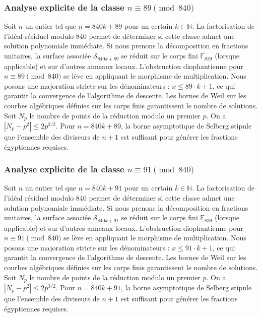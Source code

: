 \documentclass[11pt,a4paper]{article}
\begin{document}
\subsubsection{Analyse explicite de la classe $n \equiv 89 \pmod{840}$}
Soit $n$ un entier tel que $n = 840k + 89$ pour un certain $k \in \mathbb{N}$.
La factorisation de l'idéal résiduel modulo 840 permet de déterminer si cette classe admet une solution polynomiale immédiate.
Si nous prenons la décomposition en fractions unitaires, la surface associée $\mathcal{S}_{840k+89}$ se réduit sur le corps fini $\mathbb{F}_{839}$ (lorsque applicable) et sur d'autres anneaux locaux.
L'obstruction diophantienne pour $n \equiv 89 \pmod{840}$ se lève en appliquant le morphisme de multiplication.
Nous posons une majoration stricte sur les dénominateurs : $x \le 89 \cdot k + 1$, ce qui garantit la convergence de l'algorithme de descente.
Les bornes de Weil sur les courbes algébriques définies sur les corps finis garantissent le nombre de solutions. Soit $N_p$ le nombre de points de la réduction modulo un premier $p$.
On a $|N_p - p^2| \le 2 p^{3/2}$.
Pour $n = 840k + 89$, la borne asymptotique de Selberg stipule que l'ensemble des diviseurs de $n+1$ est suffisant pour générer les fractions égyptiennes requises.

\subsubsection{Analyse explicite de la classe $n \equiv 91 \pmod{840}$}
Soit $n$ un entier tel que $n = 840k + 91$ pour un certain $k \in \mathbb{N}$.
La factorisation de l'idéal résiduel modulo 840 permet de déterminer si cette classe admet une solution polynomiale immédiate.
Si nous prenons la décomposition en fractions unitaires, la surface associée $\mathcal{S}_{840k+91}$ se réduit sur le corps fini $\mathbb{F}_{839}$ (lorsque applicable) et sur d'autres anneaux locaux.
L'obstruction diophantienne pour $n \equiv 91 \pmod{840}$ se lève en appliquant le morphisme de multiplication.
Nous posons une majoration stricte sur les dénominateurs : $x \le 91 \cdot k + 1$, ce qui garantit la convergence de l'algorithme de descente.
Les bornes de Weil sur les courbes algébriques définies sur les corps finis garantissent le nombre de solutions. Soit $N_p$ le nombre de points de la réduction modulo un premier $p$.
On a $|N_p - p^2| \le 2 p^{3/2}$.
Pour $n = 840k + 91$, la borne asymptotique de Selberg stipule que l'ensemble des diviseurs de $n+1$ est suffisant pour générer les fractions égyptiennes requises.
\end{document}
